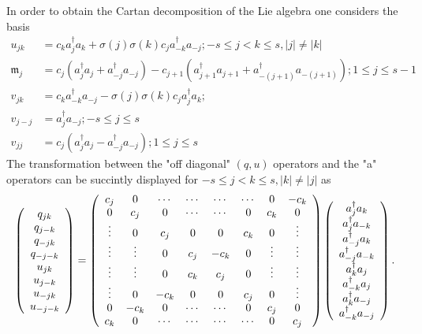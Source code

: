 \documentclass[aps,preprint]{revtex4}%
\begin{document}
In order to obtain the Cartan decomposition of the Lie algebra one considers
the basis
\begin{align}
u_{jk}  &  =c_{k}a_{j}^{\dagger}a_{k}+\sigma\left(  j\right)  \sigma\left(
k\right)  c_{j}a_{-k}^{\dagger}a_{-j};-s\leq j<k\leq s,\left\vert j\right\vert
\neq\left\vert k\right\vert \\
\mathfrak{m}_{j}  &  =c_{j}\left(  a_{j}^{\dagger}a_{j}+a_{-j}^{\dagger}%
a_{-j}\right)  -c_{j+1}\left(  a_{j+1}^{\dagger}a_{j+1}+a_{-\left(
j+1\right)  }^{\dagger}a_{-\left(  j+1\right)  }\right)  ;1\leq j\leq s-1\\
v_{jk}  &  =c_{k}a_{-k}^{\dagger}a_{-j}-\sigma\left(  j\right)  \sigma\left(
k\right)  c_{j}a_{j}^{\dagger}a_{k};\\
v_{j-j}  &  =a_{j}^{\dagger}a_{-j};-s\leq j\leq s\\
v_{jj}  &  =c_{j}\left(  a_{j}^{\dagger}a_{j}-a_{-j}^{\dagger}a_{-j}\right)
;1\leq j\leq s
\end{align}
The transformation between the "off diagonal" $\left(  q,u\right)  $ operators
and the "a" operators can be succintly displayed for $-s\leq j<k\leq
s,\left\vert k\right\vert \neq\left\vert j\right\vert $ as%
\begin{equation}
\left(
\begin{array}
[c]{c}%
q_{jk}\\
q_{j-k}\\
q_{-jk}\\
q_{-j-k}\\
u_{jk}\\
u_{j-k}\\
u_{-jk}\\
u_{-j-k}%
\end{array}
\right)  =\left(
\begin{array}
[c]{cccccccc}%
c_{j} & 0 & \cdots & \cdots & \cdots & \cdots & 0 & -c_{k}\\
0 & c_{j} & 0 & \cdots & \cdots & 0 & c_{k} & 0\\
\vdots & 0 & c_{j} & 0 & 0 & c_{k} & 0 & \vdots\\
\vdots & \vdots & 0 & c_{j} & -c_{k} & 0 & \vdots & \vdots\\
\vdots & \vdots & 0 & c_{k} & c_{j} & 0 & \vdots & \vdots\\
\vdots & 0 & -c_{k} & 0 & 0 & c_{j} & 0 & \vdots\\
0 & -c_{k} & 0 & \cdots & \cdots & 0 & c_{j} & 0\\
c_{k} & 0 & \cdots & \cdots & \cdots & \cdots & 0 & c_{j}%
\end{array}
\right)  \left(
\begin{array}
[c]{c}%
a_{j}^{\dagger}a_{k}\\
a_{j}^{\dagger}a_{-k}\\
a_{-j}^{\dagger}a_{k}\\
a_{-j}^{\dagger}a_{-k}\\
a_{k}^{\dagger}a_{j}\\
a_{-k}^{\dagger}a_{j}\\
a_{k}^{\dagger}a_{-j}\\
a_{-k}^{\dagger}a_{-j}%
\end{array}
\right)  .
\end{equation}
\end{document}
